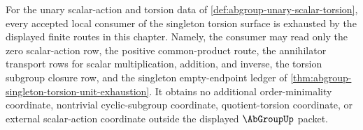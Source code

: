 \begin{theorem}
\label{thm:abgroup-torsion-local-consumer-coverage}
For the unary scalar-action and torsion data of \autoref{def:abgroup-unary-scalar-torsion}, every accepted local consumer of the singleton torsion surface is exhausted by the displayed finite routes in this chapter. Namely, the consumer may read only the zero scalar-action row, the positive common-product route, the annihilator transport rows for scalar multiplication, addition, and inverse, the torsion subgroup closure row, and the singleton empty-endpoint ledger of \autoref{thm:abgroup-singleton-torsion-unit-exhaustion}. It obtains no additional order-minimality coordinate, nontrivial cyclic-subgroup coordinate, quotient-torsion coordinate, or external scalar-action coordinate outside the displayed $\AbGroupUp$ packet.
\end{theorem}
